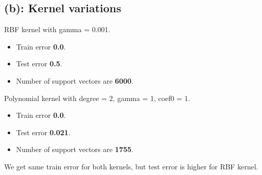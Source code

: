 \documentclass[12pt]{article}
\begin{document}
\subsection*{(b): Kernel variations}
RBF kernel with gamma = 0.001. \\
\begin{itemize}
    \item Train error  \textbf{0.0}.
    \item Test error  \textbf{0.5}.
    \item Number of support vectors are \textbf{6000}.
\end{itemize}
Polynomial kernel with degree = 2, gamma = 1, coef0 = 1. \\
\begin{itemize}
    \item Train error  \textbf{0.0}.
    \item Test error  \textbf{0.021}.
    \item Number of support vectors are \textbf{1755}.
\end{itemize}
We get same train error for both kernels, but test error is higher for RBF kernel.
\end{document}
